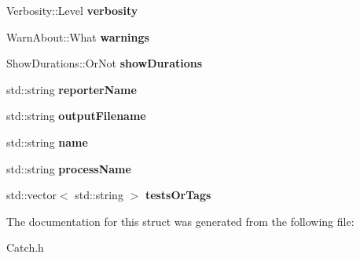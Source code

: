 \begin{DoxyCompactItemize}
\item 
\hypertarget{struct_catch_1_1_config_data_ae274b251885569a6e1feba82f2cc9a31}{Verbosity\-::\-Level {\bfseries verbosity}}\label{struct_catch_1_1_config_data_ae274b251885569a6e1feba82f2cc9a31}

\item 
\hypertarget{struct_catch_1_1_config_data_af3a1c0b4a748b24799941b59bcd9c138}{Warn\-About\-::\-What {\bfseries warnings}}\label{struct_catch_1_1_config_data_af3a1c0b4a748b24799941b59bcd9c138}

\item 
\hypertarget{struct_catch_1_1_config_data_a26b02455c7cc772ab0be25af0ac12feb}{Show\-Durations\-::\-Or\-Not {\bfseries show\-Durations}}\label{struct_catch_1_1_config_data_a26b02455c7cc772ab0be25af0ac12feb}

\item 
\hypertarget{struct_catch_1_1_config_data_a86a1832b579b5b1728e3bd04dc03c35d}{std\-::string {\bfseries reporter\-Name}}\label{struct_catch_1_1_config_data_a86a1832b579b5b1728e3bd04dc03c35d}

\item 
\hypertarget{struct_catch_1_1_config_data_a6eaa8b628b7051824ac1717a5c2e8b5c}{std\-::string {\bfseries output\-Filename}}\label{struct_catch_1_1_config_data_a6eaa8b628b7051824ac1717a5c2e8b5c}

\item 
\hypertarget{struct_catch_1_1_config_data_a6c62e90478bc2911d032ec54c2e9d8df}{std\-::string {\bfseries name}}\label{struct_catch_1_1_config_data_a6c62e90478bc2911d032ec54c2e9d8df}

\item 
\hypertarget{struct_catch_1_1_config_data_ac181ec69c5b6c925ac9bea9eaf7039c3}{std\-::string {\bfseries process\-Name}}\label{struct_catch_1_1_config_data_ac181ec69c5b6c925ac9bea9eaf7039c3}

\item 
\hypertarget{struct_catch_1_1_config_data_aa40b0e5d2f78a7addbd5c8d16a111840}{std\-::vector$<$ std\-::string $>$ {\bfseries tests\-Or\-Tags}}\label{struct_catch_1_1_config_data_aa40b0e5d2f78a7addbd5c8d16a111840}

\end{DoxyCompactItemize}


The documentation for this struct was generated from the following file\-:\begin{DoxyCompactItemize}
\item 
Catch.\-h\end{DoxyCompactItemize}
